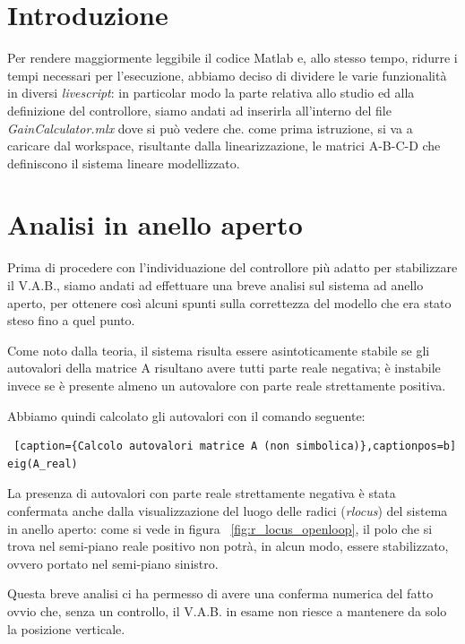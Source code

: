 \chapter{Introduzione}
Per rendere maggiormente leggibile il codice Matlab e, allo stesso tempo, ridurre i tempi necessari per l'esecuzione, abbiamo deciso di dividere le varie funzionalità in diversi \textit{livescript}: in particolar modo la parte relativa allo studio ed alla definizione del controllore, siamo andati ad inserirla all'interno del file \textit{GainCalculator.mlx} dove si può vedere che. come prima istruzione, si va a caricare dal workspace, risultante dalla linearizzazione, le matrici A-B-C-D che definiscono il sistema lineare modellizzato.

\chapter{Analisi in anello aperto}
Prima di procedere con l'individuazione del controllore più adatto per stabilizzare il V.A.B., siamo andati ad effettuare una breve analisi sul sistema ad anello aperto, per ottenere così alcuni spunti sulla correttezza del modello che era stato steso fino a quel punto.

Come noto dalla teoria, il sistema risulta essere asintoticamente stabile se gli autovalori della matrice A risultano avere tutti parte reale negativa; è instabile invece se è presente almeno un autovalore con parte reale strettamente positiva.

Abbiamo quindi calcolato gli autovalori con il comando seguente:

\begin{lstlisting} [caption={Calcolo autovalori matrice A (non simbolica)},captionpos=b]
eig(A_real)
\end{lstlisting}

La presenza di autovalori con parte reale strettamente negativa è stata confermata anche dalla visualizzazione del luogo delle radici (\textit{rlocus}) del sistema in anello aperto: come si vede in figura ~\ref{fig:r_locus_openloop}, il polo che si trova nel semi-piano reale positivo non potrà, in alcun modo, essere stabilizzato, ovvero portato nel semi-piano sinistro.

Questa breve analisi ci ha permesso di avere una conferma numerica del fatto ovvio che, senza un controllo, il V.A.B. in esame non riesce a mantenere da solo la posizione verticale.

